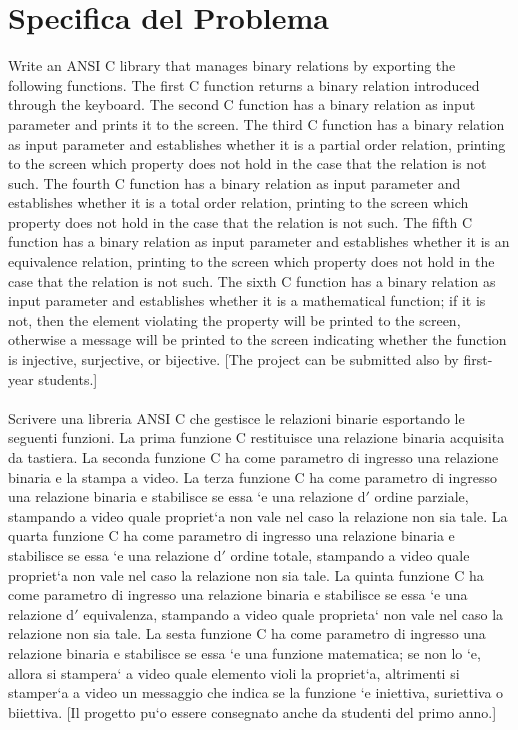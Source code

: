 \documentclass[11pt, a4paper, titlepage, block]{article}
\begin{document}
	\section{Specifica del Problema}
	Write an ANSI C library that manages binary relations by exporting the following functions. The ﬁrst C function returns a binary relation introduced through the keyboard. The second C function has a binary relation as input parameter and prints it to the screen. The third C function has a binary relation as input parameter and establishes whether it is a partial order relation, printing to the screen which property does not hold in the case that the relation is not such. The fourth C function has a binary relation as input parameter and establishes whether it is a total order relation, printing to the screen which property does not hold in the case that the relation is not such. The ﬁfth C function has a binary relation as input parameter and establishes whether it is an equivalence relation, printing to the screen which property does not hold in the case that the relation is not such. The sixth C function has a binary relation as input parameter and establishes whether it is a mathematical function; if it is not, then the element violating the property will be printed to the screen, otherwise a message will be printed to the screen indicating whether the function is injective, surjective, or bijective.
	[The project can be submitted also by ﬁrst-year students.]\\
	\\
	Scrivere una libreria ANSI C che gestisce le relazioni binarie esportando le seguenti funzioni. La prima funzione C restituisce una relazione binaria acquisita da tastiera. La seconda funzione C ha come parametro di ingresso una relazione binaria e la stampa a video. La terza funzione C ha come parametro di ingresso una relazione binaria e stabilisce se essa `e una relazione d$'$ ordine parziale, stampando a video quale propriet`a non vale nel caso la relazione non sia tale. La quarta funzione C ha come parametro di ingresso una relazione binaria e stabilisce se essa `e una relazione d$'$ ordine totale, stampando a video quale propriet`a non vale nel caso la relazione non sia tale. La quinta funzione C ha come parametro di ingresso una relazione binaria e stabilisce se essa `e una relazione d$'$ equivalenza, stampando a video quale proprieta` non vale nel caso la relazione non sia tale. La sesta funzione C ha come parametro di ingresso una relazione binaria e stabilisce se essa `e una funzione matematica; se non lo `e, allora si stampera` a video quale elemento violi la propriet`a, altrimenti si stamper`a a video un messaggio che indica se la funzione `e iniettiva, suriettiva o biiettiva.
	[Il progetto pu`o essere consegnato anche da studenti del primo anno.]\\
	\newpage
\end{document}
